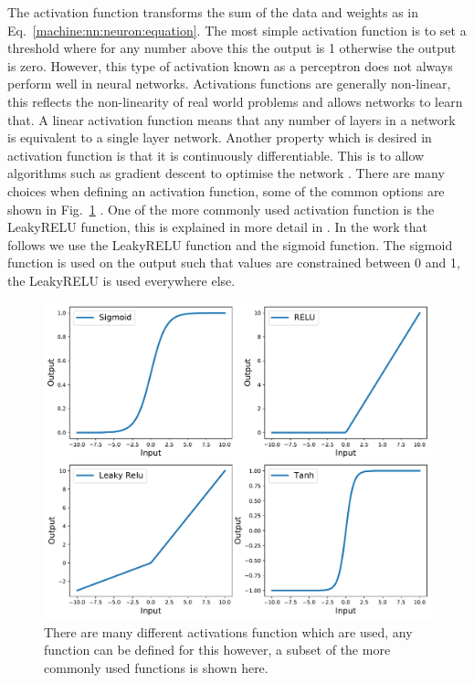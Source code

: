 The activation function transforms the sum of the data and weights as in Eq.~\ref{machine:nn:neuron:equation}. 
The most simple activation function is to set a threshold where for any number above this the output is 1 otherwise the output is zero. However, this type of activation known as a perceptron does not always perform well in neural networks.
Activations functions are generally non-linear, this reflects the non-linearity of real world problems and allows networks to learn that. 
A linear activation function means that any number of layers in a network is equivalent to a single layer network.
Another property which is desired in activation function is that it is continuously differentiable. This is to allow algorithms such as gradient descent to optimise the network \citep{nwankpa2018ActivationFunctions}. 
There are many choices when defining an activation function, some of the common options are shown in Fig.~\ref{machine:nn:activation:plot} \citep{nwankpa2018ActivationFunctions}.
One of the more commonly used activation function is the LeakyRELU function, this is explained in more detail in \citep{maas2013RectifierNonlinearities}.
In the work that follows we use the LeakyRELU function and the sigmoid function.
The sigmoid function is used on the output such that values are constrained between 0 and 1, the LeakyRELU is used everywhere else. 


\begin{figure}[ht]
	\centering
	\includegraphics[width=0.8\columnwidth]{C4_cnn/activations.pdf}
	\caption[Examples of activation functions.]{There are many different activations function which are used, any function can be defined for this however, a subset of the more commonly used functions is shown here.}
	\label{machine:nn:activation:plot}
\end{figure}





